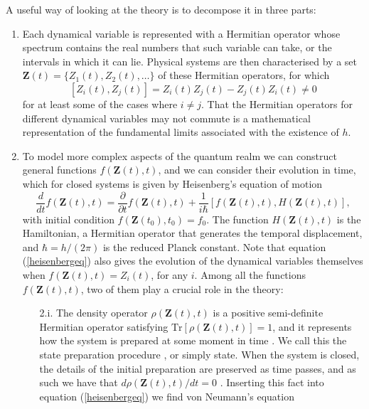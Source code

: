 A useful way of looking at the theory is to decompose it in three parts:
\begin{enumerate}
\item Each dynamical variable is represented with a Hermitian operator whose spectrum contains the real numbers that such variable can take, or the intervals in which it can lie. Physical systems are then characterised by a set $\boldsymbol{Z}(t) = \lbrace Z_1(t), Z_2(t), \dots\rbrace$ of these Hermitian operators, for which
\begin{equation}
\left[Z_i(t),Z_j(t)\right] = Z_i(t)Z_j(t) - Z_j(t)Z_i(t) \neq 0
\label{commutator}
\end{equation}
for at least some of the cases where $i \neq j$. That the Hermitian operators for different dynamical variables may not commute is a mathematical representation of the fundamental limits associated with the existence of $h$.
\item To model more complex aspects of the quantum realm we can construct general functions $f(\boldsymbol{Z}(t), t)$, and we can consider their evolution in time, which for closed systems is given by Heisenberg's equation of motion \cite{englert2013, schwinger2001}
\begin{equation}
\frac{d}{d t} f(\boldsymbol{Z}(t), t) = \frac{\partial}{\partial t}f(\boldsymbol{Z}(t), t) + \frac{1}{i\hbar} \left[f(\boldsymbol{Z}(t), t),H(\boldsymbol{Z}(t), t)\right],
\label{heisenbergeq}
\end{equation}
with initial condition $f(\boldsymbol{Z}(t_0), t_0) = f_0$. The function $H(\boldsymbol{Z}(t), t)$ is the Hamiltonian, a Hermitian operator that generates the temporal displacement, and $\hbar = h/(2\pi)$ is the reduced Planck constant. Note that equation (\ref{heisenbergeq}) also gives the evolution of the dynamical variables themselves when $f(\boldsymbol{Z}(t), t) = Z_i(t)$, for any $i$. Among all the functions $f(\boldsymbol{Z}(t), t)$, two of them play a crucial role in the theory:
\begin{enumerate}
\item[2.i.] The density operator $\rho(\boldsymbol{Z}(t), t)$ is a positive semi-definite Hermitian operator satisfying $\mathrm{Tr}[\rho(\boldsymbol{Z}(t),t)] = 1$, and it represents how the system is prepared at some moment in time \cite{englert2013,ballentine1998}. We call this the state preparation procedure \cite{ballentine1998}, or simply state. When the system is closed, the details of the initial preparation are preserved as time passes, and as such we have that $d\rho(\boldsymbol{Z}(t),t)/dt = 0$ \cite{englert2013, schwinger2001}. Inserting this fact into equation (\ref{heisenbergeq}) we find von Neumann's equation

\end{enumerate}
\end{enumerate}
